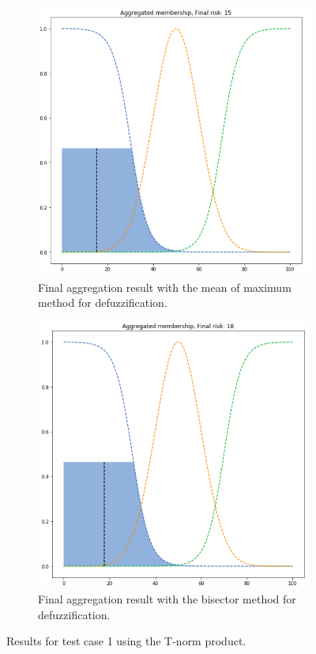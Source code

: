 \documentclass[conference]{IEEEtran}
\begin{document}
\begin{figure}[ht]
\begin{subfigure}{.5\textwidth}
  \centering
  \includegraphics[width=.8\linewidth]{figures/first/prod-mom.png}  
  \caption{Final aggregation result with the mean of maximum method for defuzzification.}
  \label{fig:1prod-mom}
\end{subfigure}
\begin{subfigure}{.5\textwidth}
  \centering
  \includegraphics[width=.8\linewidth]{figures/first/prod-bisector.png}  
  \caption{Final aggregation result with the bisector method for defuzzification.}
  \label{fig:1prod-bisector}
\end{subfigure}
\caption{Results for test case 1 using the T-norm product.}
\label{fig:testcase1prod}
\end{figure}
\end{document}
